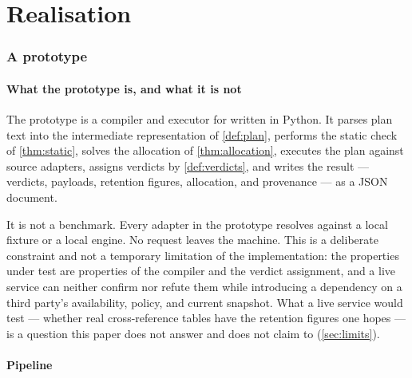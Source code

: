 \part{Realisation}

\section{A prototype}
\label{sec:proto}

\subsection{What the prototype is, and what it is not}

The prototype is a compiler and executor for \HFQ{} written in Python. It parses
plan text into the intermediate representation of \cref{def:plan}, performs the
static check of \cref{thm:static}, solves the allocation of
\cref{thm:allocation}, executes the plan against source adapters, assigns
verdicts by \cref{def:verdicts}, and writes the result --- verdicts, payloads,
retention figures, allocation, and provenance --- as a JSON document.

It is not a benchmark. Every adapter in the prototype resolves against a local
fixture or a local engine. No request leaves the machine. This is a deliberate
constraint and not a temporary limitation of the implementation: the properties
under test are properties of the compiler and the verdict assignment, and a
live service can neither confirm nor refute them while introducing a dependency
on a third party's availability, policy, and current snapshot. What a live
service would test --- whether real cross-reference tables have the retention
figures one hopes --- is a question this paper does not answer and does not
claim to (\cref{sec:limits}).

\subsection{Pipeline}

